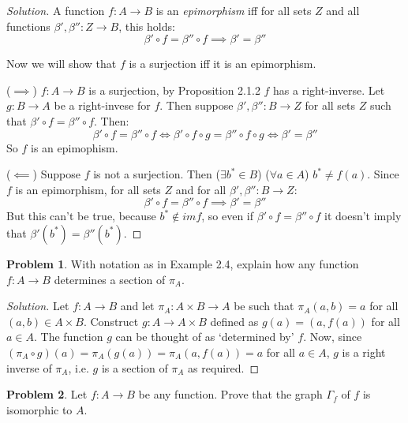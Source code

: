 \documentclass[fontsize=14pt]{scrartcl}
\theoremstyle{definition}
\newtheorem{problem-internal}{Problem}[subsection]
\newenvironment{problem}{
  \medskip
  \begin{problem-internal}
}{
  \end{problem-internal}
}
\newenvironment{solution}{
  \begin{proof}[Solution]
  \vspace{-8px}
  \setlength{\parskip}{4px}
  \setlength{\parindent}{0px}
}{
  \end{proof}
}
\begin{document}
\begin{solution}
A function $f:A\to B$ is an \textit{epimorphism} iff for all sets $Z$
and all functions $\beta{'}, \beta{''}:Z\to B$, this holds:
\[ \beta{'} \circ f = \beta{''} \circ f \implies \beta{'} = \beta{''} \]

Now we will show that $f$ is a surjection iff it is an epimorphism.

($\implies$) $f: A\to B$ is a surjection, by Proposition 2.1.2 $f$ has a right-inverse. 
Let $g: B\to A$ be a right-invese for $f$. Then suppose $ \beta{'}, \beta{''} : B\to Z $
for all sets $Z$ such that $\beta{'} \circ f = \beta{''} \circ f$. Then:
\[ \beta{'} \circ f = \beta{''} \circ f \iff \beta{'} \circ f \circ g = \beta{''} \circ f \circ g 
\iff \beta{'} = \beta{''} \]
So $f$ is an epimophism.

($\impliedby$) 
Suppose $f$ is not a surjection. Then ($\exists b^* \in B$) ($\forall a \in A$) $ b^* \neq f(a) $. Since $f$ is an epimorphism,
for all sets $Z$ and for all $\beta{'}, \beta{''}: B\to Z$:
\[ \beta{'} \circ f = \beta{''} \circ f \implies \beta{'} = \beta{''} \]
But this can't be true, because $b^* \notin im f$, so even if $\beta{'} \circ f = \beta{''} \circ f$ 
it doesn't imply that $\beta{'}(b^*) = \beta{''}(b^*)$.
\end{solution}


\begin{problem}
With notation as in Example 2.4, explain how any function $f:A\to B$ determines
a section of $\pi_A$.
\end{problem}

\begin{solution}
Let $f:A\to B$ and let $\pi_A:A\times B\to A$ be such that $\pi_A(a,b) = a$ for
all $(a,b)\in A\times B$. Construct $g:A\to A\times B$ defined as $g(a) = (a,
f(a))$ for all $a\in A$. The function $g$ can be thought of as `determined by'
$f$. Now, since $(\pi_A\circ g)(a) = \pi_A(g(a)) = \pi_A(a, f(a)) = a$ for all
$a\in A$, $g$ is a right inverse of $\pi_A$, i.e. $g$ is a section of $\pi_A$ as
required.
\end{solution}


\begin{problem}
Let $f:A\to B$ be any function. Prove that the graph $\Gamma_f$ of $f$ is
isomorphic to $A$.
\end{problem}
\end{document}
